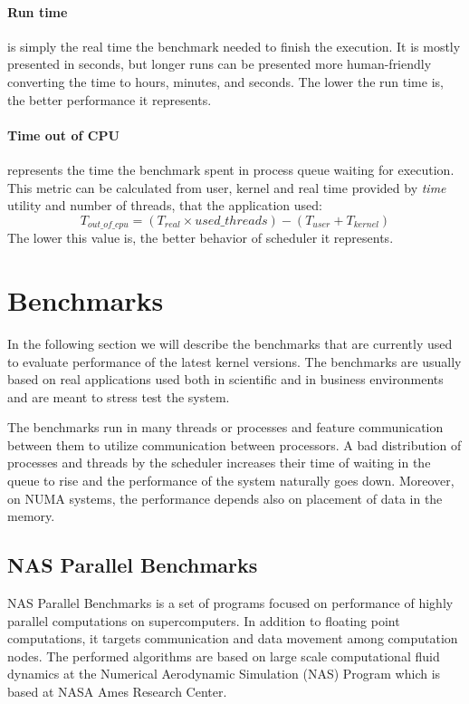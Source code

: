 \paragraph{Run time} is simply the real time the benchmark needed to finish the
execution. It is mostly presented in seconds, but longer runs can be presented
more human-friendly converting the time to hours, minutes, and seconds. The
lower the run time is, the better performance it represents.

\paragraph{Time out of CPU} represents the time the benchmark spent in process
queue waiting for execution. This metric can be calculated from user, kernel and
real time provided by \emph{time} utility and number of threads, that the
application used:
$$T_{out\_of\_cpu} = (T_{real} \times used\_threads) - (T_{user} + T_{kernel})$$
The lower this value is, the better behavior of scheduler it represents.

\section{Benchmarks}
In the following section we will describe the benchmarks that are currently used
to evaluate performance of the latest kernel versions. The benchmarks are
usually based on real applications used both in scientific and in business
environments and are meant to stress test the system.

The benchmarks run in many threads or processes and feature communication
between them to utilize communication between processors. A bad distribution of
processes and threads by the scheduler increases their time of waiting in the
queue to rise and the performance of the system naturally goes down. Moreover,
on NUMA systems, the performance depends also on placement of data in the
memory.

\subsection{NAS Parallel Benchmarks}
NAS Parallel Benchmarks\;\cite{nas-parallel} is a set of programs focused on
performance of highly parallel computations on supercomputers. In addition to
floating point computations, it targets communication and data movement among
computation nodes. The performed algorithms are based on large scale
computational fluid dynamics at the Numerical Aerodynamic Simulation (NAS)
Program which is based at NASA Ames Research Center.

